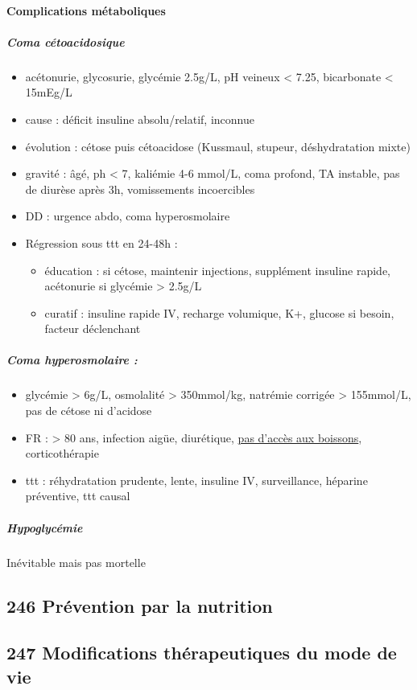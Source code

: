 \documentclass[11pt]{article}
\begin{document}
\paragraph{Complications métaboliques}
\label{sec:org4d877eb}
\subparagraph{Coma cétoacidosique}
\label{sec:org28bfa52}
\begin{itemize}
\item acétonurie, glycosurie, glycémie 2.5g/L, pH veineux < 7.25, bicarbonate <
15mEg/L
\item cause : déficit insuline absolu/relatif, inconnue
\item évolution : cétose puis cétoacidose (Kussmaul, stupeur, déshydratation mixte)
\item gravité : âgé, ph < 7, kaliémie 4-6 mmol/L, coma profond, TA instable, pas de
diurèse après 3h, vomissements incoercibles
\item DD : urgence abdo, coma hyperosmolaire
\item Régression sous ttt en 24-48h : 
\begin{itemize}
\item éducation : si cétose, maintenir injections, supplément insuline rapide,
acétonurie si glycémie > 2.5g/L
\item curatif : insuline rapide IV, recharge volumique, K+, glucose
si besoin, facteur déclenchant
\end{itemize}
\end{itemize}

\subparagraph{Coma hyperosmolaire :}
\label{sec:orgc2a43b6}
\begin{itemize}
\item glycémie > 6g/L, osmolalité > 350mmol/kg, natrémie corrigée > 155mmol/L, pas
de cétose ni d'acidose
\item FR : > 80 ans, infection aigüe, diurétique, \uline{pas d'accès aux boissons}, corticothérapie
\item ttt : réhydratation prudente, lente, insuline IV, surveillance, héparine
préventive, ttt causal
\end{itemize}

\subparagraph{Hypoglycémie}
\label{sec:org35012ea}
Inévitable  mais pas mortelle
\subsection{246 \textdagger{} Prévention par la nutrition}
\label{sec:orged1700f}
\subsection{247 \textdagger{} Modifications thérapeutiques du mode de vie}
\label{sec:org004c1da}
\end{document}
